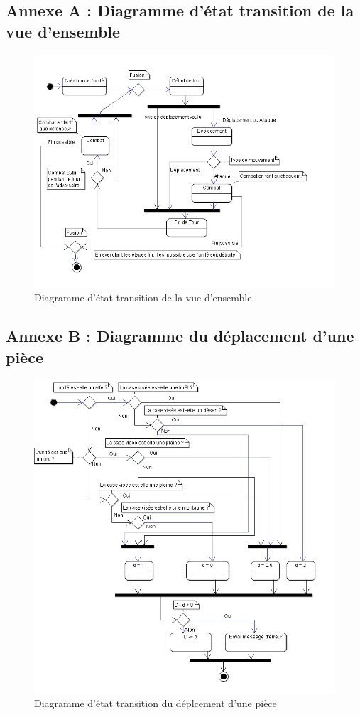 
\subsection{Annexe A : Diagramme d'état transition de la vue d'ensemble}
\begin{figure}[!h]
\centering
\includegraphics[scale=0.70]{img/VueDensemble.png}
\caption{Diagramme d'état transition de la vue d'ensemble}
\end{figure}
\clearpage

\subsection{Annexe B : Diagramme du déplacement d'une pièce}
\begin{figure}[!h]
\centering
\includegraphics[scale=0.65]{img/Deplacement.png}
\caption{Diagramme d'état transition du déplcement d'une pièce}
\end{figure}
\clearpage

